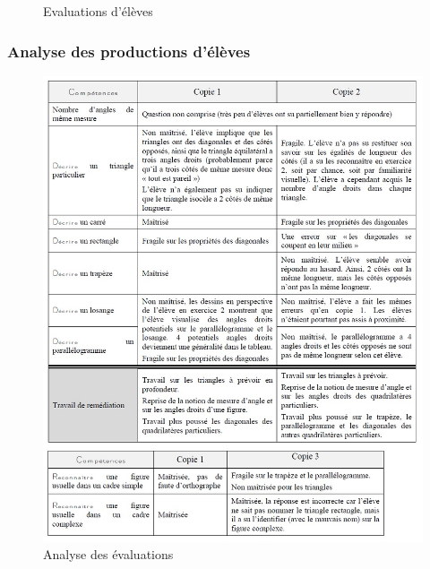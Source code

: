 \begin{figure}[!h]
	\qquad
	\caption{Evaluations d'élèves}
	\label{fig:Eval_diag_copies}
\end{figure}
\subsubsection*{Analyse des productions d'élèves}
\begin{figure}[!h]
	\centering
	\includegraphics[scale=0.75]{img/Analyse_eval_diag_ju.jpg}
	\caption{Analyse des évaluations}
\end{figure}

